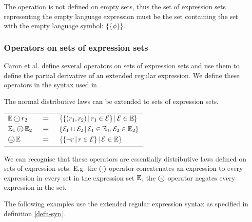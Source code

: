 The operation is not defined on empty sets, thus the set of expression sets
representing the empty language expression must be the set containing the set
with the empty language symbol: $\{\{\phi\}\}$.

\subsubsection{Operators on sets of expression sets}

Caron et al. define several operators on sets of expression sets and use them to
define the partial derivative of an extended regular expression\cite{pdere}. We
define these operators in the syntax used in \cite{pdpat}.

\begin{defn}
   \label{defn-eset-ops}
   The normal distributive laws can be extended to sets of expression sets.

   \begin{tabular}{lll}
      $\esets \circledcdot r_2$
         & $=$
         & $\{ \{ (r_1, r_2) \operatorname{|} r_1 \in \mathcal{E} \} \operatorname{|} \mathcal{E} \in \mathbb{E} \}$
         \\

      $\mathbb{E}_1 \operatorname{\text{\textcircled{\tiny$\cap$}}} \mathbb{E}_2$
         & $=$
         & $\{
              \mathcal{E}_1 \cup \mathcal{E}_2
              \operatorname{|} \mathcal{E}_1 \in \mathbb{E}_1, \mathcal{E}_2 \in \mathbb{E}_2
           \}$
         \\

      $\operatorname{\text{\textcircled{\tiny$\neg$}}}\mathbb{E}$
         & $=$
         & $\{ \{ \neg r \operatorname{|} r \in \mathcal{E} \} \operatorname{|} \mathcal{E} \in \mathbb{E} \}$
         \\
   \end{tabular}
\end{defn}

We can recognise that these operators are essentially distributive laws defined
on sets of expression sets. E.g. the $\circledcdot$ operator concatenates an
expression to every expression in every set in the expression set $\mathbb{E}$, the
$\operatorname{\text{\textcircled{\tiny$\neg$}}}$ operator negates every expression in the set.

The following examples use the extended regular expression syntax as specified
in definition \ref{defn-syn}.

